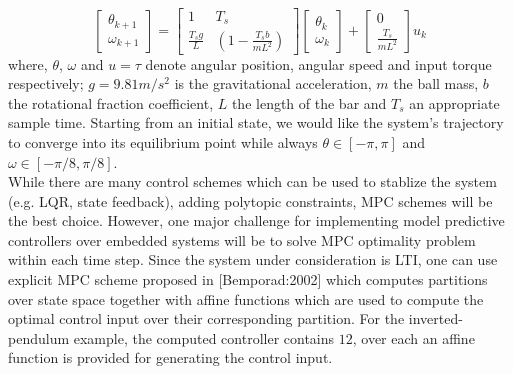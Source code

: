 	\begin{equation}
		\begin{bmatrix}
			 \theta_{k+1}\\
			\omega_{k+1}
		\end{bmatrix}=
		\begin{bmatrix}
			1 & T_s\\
			\frac{T_sg}{L}& (1-\frac{T_sb}{mL^2})		
		\end{bmatrix}
		\begin{bmatrix}
			\theta_k\\
			\omega_k
		\end{bmatrix}+
		\begin{bmatrix}
			0\\
			\frac{T_s}{mL^2}
		\end{bmatrix}u_k
		\label{eq:pendul_ss}
	\end{equation}
	where, $\theta$, $\omega$ and $u=\tau$ denote angular position, angular speed and input torque respectively; $g=9.81 m/s^2$ is the gravitational acceleration, $m$ the ball mass, $b$ the rotational fraction coefficient, $L$ the length of the bar and $T_s$ an appropriate sample time. Starting from an initial state, we would like the system's trajectory to converge into its equilibrium point while always $\theta\in[-\pi,\pi]$ and $\omega\in[-\pi/8,\pi/8]$. \\
	While there are many control schemes which can be used to stablize the system (e.g. LQR, state feedback), adding polytopic constraints, MPC schemes will be the best choice. 
	However, one major challenge for implementing model predictive controllers over embedded systems will be to solve MPC optimality problem within each time step. Since the system under consideration is LTI, one can use explicit MPC scheme proposed in [Bemporad:2002] which computes partitions over state space together with affine functions which are used to compute the optimal control input over their corresponding partition. For the inverted-pendulum example, the computed controller contains $12$, over each an affine function is provided for generating the control input.\\
